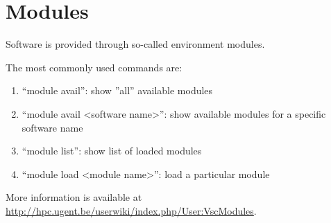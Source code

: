 \chapter{Modules}

Software is provided through so-called environment modules.

The most commonly used commands are:

\begin{enumerate}
 \item ``module avail'': show ''all'' available modules
 \item ``module avail <software name>'': show available modules for a specific software name
 \item ``module list'': show list of loaded modules
 \item ``module load <module name>'': load a particular module
\end{enumerate}

More information is available at
\url{http://hpc.ugent.be/userwiki/index.php/User:VscModules}.
